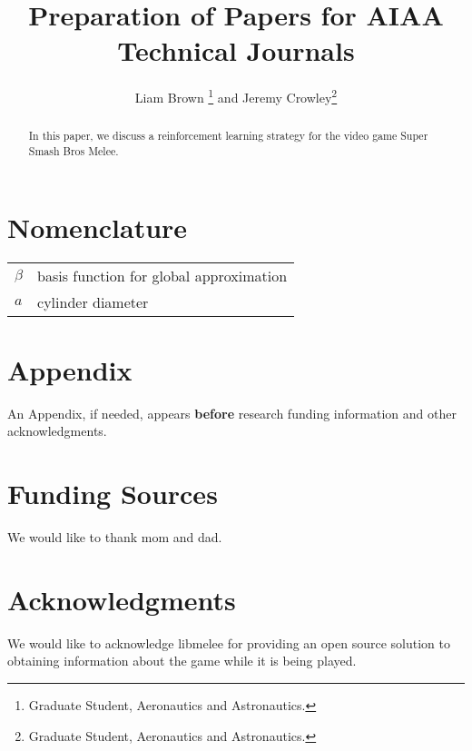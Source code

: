 \documentclass[journal]{new-aiaa}
\title{Preparation of Papers for AIAA Technical Journals}
\author{Liam Brown \footnote{Graduate Student, Aeronautics and Astronautics.} and Jeremy Crowley\footnote{Graduate Student, Aeronautics and Astronautics.}}
\affil{Stanford Universiry, Stanford, CA, 94305}
\begin{document}
\maketitle

\begin{abstract}
In this paper, we discuss a reinforcement learning strategy for the video game Super Smash Bros Melee. 
\end{abstract}

\section*{Nomenclature}

{\renewcommand\arraystretch{1.0}
\noindent\begin{longtable*}{@{}l @{\quad=\quad} l@{}}
$\beta$  & basis function for global approximation \\
$a$ &    cylinder diameter \\
\end{longtable*}}


%
%



%
%
%


%
%



%
%



%
%



%
%



%
%
\section*{Appendix}

An Appendix, if needed, appears \textbf{before} research funding information and other acknowledgments.


%
%
\section*{Funding Sources}

We would like to thank mom and dad.


%
%
\section*{Acknowledgments}

We would like to acknowledge libmelee for providing an open source solution to obtaining information about the game while it is being played.



\end{document}
